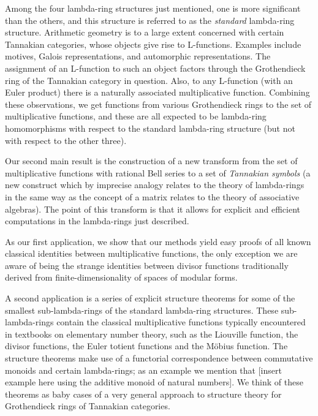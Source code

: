 Among the four lambda-ring structures just mentioned, one is more significant than the others, and this structure is referred to as the \emph{standard} lambda-ring structure. Arithmetic geometry is to a large extent concerned with certain Tannakian categories, whose objects give rise to L-functions. Examples include motives, Galois representations, and automorphic representations. The assignment of an L-function to such an object factors through the Grothendieck ring of the Tannakian category in question. Also, to any L-function (with an Euler product) there is a naturally associated multiplicative function. Combining these observations, we get functions from various Grothendieck rings to the set of multiplicative functions, and these are all expected to be lambda-ring homomorphisms with respect to the standard lambda-ring structure (but not with respect to the other three). 

Our second main result is the construction of a new transform from the set of multiplicative functions with rational Bell series to a set of \emph{Tannakian symbols} (a new construct which by imprecise analogy relates to the theory of lambda-rings in the same way as the concept of a matrix relates to the theory of associative algebras). The point of this transform is that it allows for explicit and efficient computations in the lambda-rings just described.

As our first application, we show that our methods yield easy proofs of all known classical identities between multiplicative functions, the only exception we are aware of being the strange identities between divisor functions traditionally derived from finite-dimensionality of spaces of modular forms. %

A second application is a series of explicit structure theorems for some of the smallest sub-lambda-rings of the standard lambda-ring structures. These sub-lambda-rings contain the classical multiplicative functions typically encountered in textbooks on elementary number theory, such as the Liouville function, the divisor functions, the Euler totient functions and the M\"obius function. The structure theorems make use of a functorial correspondence between commutative monoids and certain lambda-rings; as an example we mention that [insert example here using the additive monoid of natural numbers]. We think of these theorems as baby cases of a very general approach to structure theory for Grothendieck rings of Tannakian categories.

